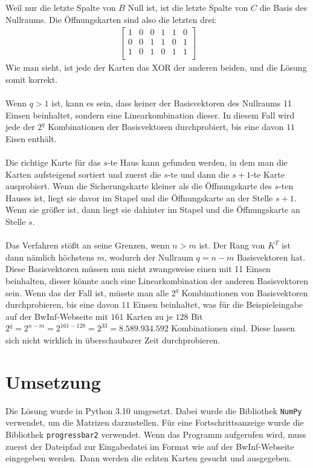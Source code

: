 \documentclass[a4paper,10pt,ngerman]{scrartcl}
\begin{document}
Weil nur die letzte Spalte von $B$ Null ist, ist die letzte Spalte von $C$ die Basis des Nullraums. Die Öffnungskarten sind also die letzten drei:
\begin{align*}
\left[\begin{array}{cccccc}
1 & 0 & 0 & 1 & 1 & 0 \\
0 & 0 & 1 & 1 & 0 & 1 \\
1 & 0 & 1 & 0 & 1 & 1 \\
\end{array}\right]
\end{align*}
Wie man sieht, ist jede der Karten das XOR der anderen beiden, und die Lösung somit korrekt. \\\\
Wenn $q>1$ ist, kann es sein, dass keiner der Basisvektoren des Nullraums 11 Einsen beinhaltet, sondern eine Linearkombination dieser. In diesem Fall wird jede der $2^q$ Kombinationen der Basisvektoren durchprobiert, bis eine davon $11$ Eisen enthält.\\\\
Die richtige Karte für das $s$-te Haus kann gefunden werden, in dem man die Karten aufsteigend sortiert und zuerst die $s$-te und dann die $s+1$-te Karte ausprobiert. Wenn die Sicherungskarte kleiner als die Öffnungskarte des $s$-ten Hauses ist, liegt sie davor im Stapel und die Öffnungskarte an der Stelle $s+1$. Wenn sie größer ist, dann liegt sie dahinter im Stapel und die Öffnungskarte an Stelle $s$.\\
\\
Das Verfahren stößt an seine Grenzen, wenn $n>m$ ist. Der Rang von $K^T$ ist dann nämlich höchstens $m$, wodurch der Nullraum $q=n-m$ Basisvektoren hat. Diese Basisvektoren müssen nun nicht zwangsweise einen mit 11 Einsen beinhalten, dieser könnte auch eine Linearkombination der anderen Basisvektoren sein. Wenn das der Fall ist, müsste man alle $2^q$ Kombinationen von Basisvektoren durchprobieren, bis eine davon $11$ Einsen beinhaltet, was für die Beispieleingabe auf der BwInf-Webseite mit $161$ Karten zu je $128$ Bit $2^q=2^{n-m}=2^{161-128}=2^{33}=8.589.934.592$ Kombinationen sind. Diese lassen sich nicht wirklich in überschaubarer Zeit durchprobieren.
\section{Umsetzung}
Die Lösung wurde in Python 3.10 umgesetzt. Dabei wurde die Bibliothek \lstinline|NumPy| verwendet, um die Matrizen darzustellen. Für eine Fortschrittsanzeige wurde die Bibliothek \lstinline|progressbar2| verwendet. Wenn das Programm aufgerufen wird, muss zuerst der Dateipfad zur Eingabedatei im Format wie auf der BwInf-Webseite eingegeben werden. Dann werden die echten Karten gesucht und ausgegeben.
\end{document}
